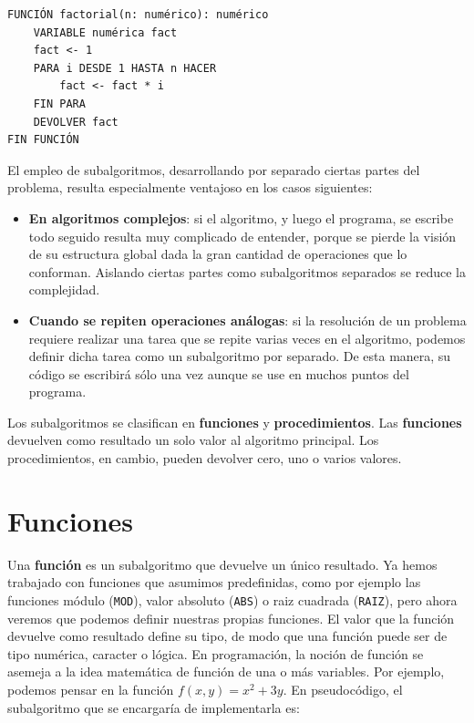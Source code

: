 \documentclass[]{book}
\providecommand{\tightlist}{%
  \setlength{\itemsep}{0pt}\setlength{\parskip}{0pt}}
\begin{document}
\begin{verbatim}
FUNCIÓN factorial(n: numérico): numérico
    VARIABLE numérica fact
    fact <- 1
    PARA i DESDE 1 HASTA n HACER
        fact <- fact * i
    FIN PARA
    DEVOLVER fact
FIN FUNCIÓN
\end{verbatim}

El empleo de subalgoritmos, desarrollando por separado ciertas partes
del problema, resulta especialmente ventajoso en los casos siguientes:

\begin{itemize}
\tightlist
\item
  \textbf{En algoritmos complejos}: si el algoritmo, y luego el
  programa, se escribe todo seguido resulta muy complicado de entender,
  porque se pierde la visión de su estructura global dada la gran
  cantidad de operaciones que lo conforman. Aislando ciertas partes como
  subalgoritmos separados se reduce la complejidad.
\item
  \textbf{Cuando se repiten operaciones análogas}: si la resolución de
  un problema requiere realizar una tarea que se repite varias veces en
  el algoritmo, podemos definir dicha tarea como un subalgoritmo por
  separado. De esta manera, su código se escribirá sólo una vez aunque
  se use en muchos puntos del programa.
\end{itemize}

Los subalgoritmos se clasifican en \textbf{funciones} y
\textbf{procedimientos}. Las \textbf{funciones} devuelven como resultado
un solo valor al algoritmo principal. Los procedimientos, en cambio,
pueden devolver cero, uno o varios valores.

\section{Funciones}\label{funciones}

Una \textbf{función} es un subalgoritmo que devuelve un único resultado.
Ya hemos trabajado con funciones que asumimos predefinidas, como por
ejemplo las funciones módulo (\texttt{MOD}), valor absoluto
(\texttt{ABS}) o raiz cuadrada (\texttt{RAIZ}), pero ahora veremos que
podemos definir nuestras propias funciones. El valor que la función
devuelve como resultado define su tipo, de modo que una función puede
ser de tipo numérica, caracter o lógica. En programación, la noción de
función se asemeja a la idea matemática de función de una o más
variables. Por ejemplo, podemos pensar en la función
\(f(x, y) = x^2 + 3y\). En pseudocódigo, el subalgoritmo que se
encargaría de implementarla es:
\end{document}

